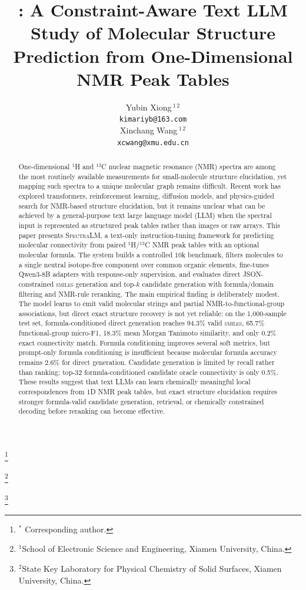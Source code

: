 \documentclass{article}
\title{\spectralm: A Constraint-Aware Text LLM Study of Molecular Structure Prediction from One-Dimensional NMR Peak Tables}
\author{%
  Yubin Xiong\,$^{1\,2}$ \\
  \texttt{kimariyb@163.com} \\
  \And
  Xinchang Wang\footnotemark[1]\;\,${}^{1\,2}$\\
  \texttt{xcwang@xmu.edu.cn} 
}
\newcommand{\smiles}{\textsc{smiles}}
\newcommand{\spectralm}{\textsc{SpectraLM}}
\newcommand\blfootnote[1]{%
  \begingroup
  \renewcommand\thefootnote{}\footnote{#1}%
  \addtocounter{footnote}{-1}%
  \endgroup
}
\begin{document}
\maketitle

\begin{abstract}
One-dimensional \(^{1}\)H and \(^{13}\)C nuclear magnetic resonance (NMR) spectra are among the most routinely available measurements for small-molecule structure elucidation, yet mapping such spectra to a unique molecular graph remains difficult. Recent work has explored transformers, reinforcement learning, diffusion models, and physics-guided search for NMR-based structure elucidation, but it remains unclear what can be achieved by a general-purpose text large language model (LLM) when the spectral input is represented as structured peak tables rather than images or raw arrays. This paper presents \spectralm, a text-only instruction-tuning framework for predicting molecular connectivity from paired \(^{1}\)H/\(^{13}\)C NMR peak tables with an optional molecular formula. The system builds a controlled 10k benchmark, filters molecules to a single neutral isotope-free component over common organic elements, fine-tunes Qwen3-8B adapters with response-only supervision, and evaluates direct JSON-constrained \smiles{} generation and top-\(k\) candidate generation with formula/domain filtering and NMR-rule reranking. The main empirical finding is deliberately modest. The model learns to emit valid molecular strings and partial NMR-to-functional-group associations, but direct exact structure recovery is not yet reliable: on the 1,000-sample test set, formula-conditioned direct generation reaches 94.3\% valid \smiles{}, 65.7\% functional-group micro-F1, 18.3\% mean Morgan Tanimoto similarity, and only 0.2\% exact connectivity match. Formula conditioning improves several soft metrics, but prompt-only formula conditioning is insufficient because molecular formula accuracy remains 2.6\% for direct generation. Candidate generation is limited by recall rather than ranking: top-32 formula-conditioned candidate oracle connectivity is only 0.5\%. These results suggest that text LLMs can learn chemically meaningful local correspondences from 1D NMR peak tables, but exact structure elucidation requires stronger formula-valid candidate generation, retrieval, or chemically constrained decoding before reranking can become effective.
\end{abstract}

\blfootnote{\hspace{-6mm}${}^*$ Corresponding author.}
\blfootnote{\hspace{-6mm}$^{1}$School of Electronic Science and Engineering, Xiamen University, China.}
\blfootnote{\hspace{-6mm}$^{2}$State Key Laboratory for Physical Chemistry of Solid Surfaces, Xiamen University, China.}
\end{document}
